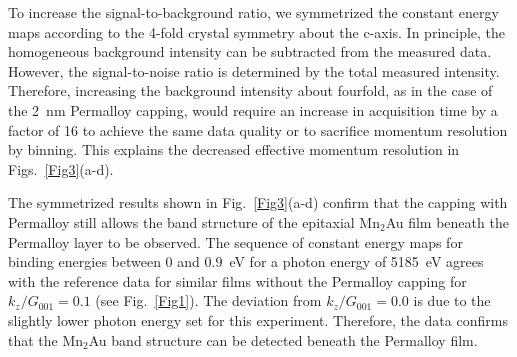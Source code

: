 \documentclass[aps,prb,twocolumn,superscriptaddress,10pt]{revtex4-1}
\begin{document}
To increase the signal-to-background ratio, we symmetrized the constant energy maps 
according to the 4-fold crystal symmetry about the c-axis.
In principle, the homogeneous background intensity can be subtracted
from the measured data. 
However, the signal-to-noise ratio is determined by the total measured intensity.
Therefore, increasing the background intensity about fourfold,
as in the case of the 2~nm Permalloy capping,
would require an increase in acquisition time by a factor of 16 to 
achieve the same data quality or to sacrifice momentum resolution by binning. 
This explains the decreased effective momentum resolution in 
Figs.~\ref{Fig3}(a-d).

The symmetrized results shown in Fig.~\ref{Fig3}(a-d) confirm that the capping with 
Permalloy still allows the band structure of the epitaxial Mn$_2$Au film  beneath the Permalloy layer to be observed.   
The sequence of constant energy maps for binding energies between 0 and 0.9~eV
for a photon energy of 5185~eV
agrees with the reference data for similar films without the Permalloy capping for
$k_z/G_{001}=0.1$ (see Fig.~\ref{Fig1}). 
The deviation from $k_z/G_{001}=0.0$ is due to the slightly lower photon energy
set for this experiment.
Therefore, the data confirms that the Mn$_2$Au band structure can be detected beneath the Permalloy film.
\end{document}
